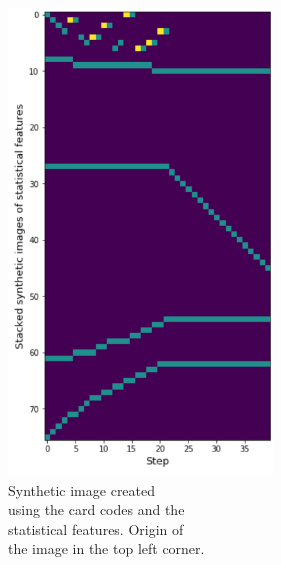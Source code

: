 \begin{minipage}{0.5\textwidth}
	\begin{figure}[H]
	\centering
	\includegraphics[width=7cm]{images/synImageOriginal.png}
	\caption[Bild kurz]{Synthetic image created \\\hspace{0\textwidth}using the card codes and the \\\hspace{0\textwidth}statistical features. Origin of \\\hspace{0\textwidth}the image in the top left corner.}
	\label{fig:synImOr}
\end{figure}
\end{minipage}
